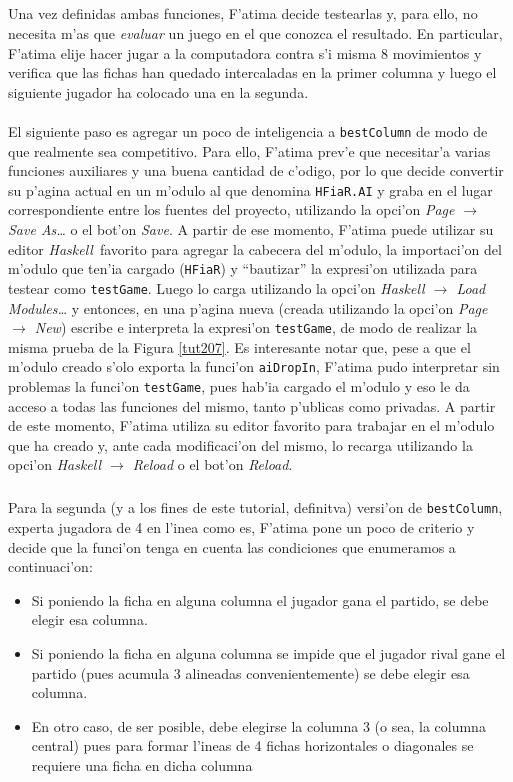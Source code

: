 \documentclass[a4paper]{article}
\newcommand{\haskell}{\textsl{Haskell}}
\begin{document}
\newpage
\subparagraph{}Una vez definidas ambas funciones, F'atima decide testearlas y, para ello, no necesita m'as que \textsl{evaluar} un juego en el que conozca el resultado.  En particular, F'atima elije hacer jugar a la computadora contra s'i misma 8 movimientos y verifica que las fichas han quedado intercaladas en la primer columna y luego el siguiente jugador ha colocado una en la segunda.
\paragraph{}El siguiente paso es agregar un poco de inteligencia a \texttt{bestColumn} de modo de que realmente sea competitivo.  Para ello, F'atima prev'e que necesitar'a varias funciones auxiliares y una buena cantidad de c'odigo, por lo que decide convertir su p'agina actual en un m'odulo al que denomina \texttt{HFiaR.AI} y graba en el lugar correspondiente entre los fuentes del proyecto, utilizando la opci'on \textsl{Page $\rightarrow$ Save As\ldots} o el bot'on \textsl{Save}.  A partir de ese momento, F'atima puede utilizar su editor \haskell\ favorito para agregar la cabecera del m'odulo, la importaci'on del m'odulo que ten'ia cargado (\texttt{HFiaR}) y ``bautizar'' la expresi'on utilizada para testear como \texttt{testGame}.  Luego lo carga utilizando la opci'on \textsl{Haskell $\rightarrow$ Load Modules\ldots} y entonces, en una p'agina nueva (creada utilizando la opci'on \textsl{Page $\rightarrow$ New}) escribe e interpreta la expresi'on \texttt{testGame}, de modo de realizar la misma prueba de la Figura \ref{tut207}.  Es interesante notar que, pese a que el m'odulo creado s'olo exporta la funci'on \texttt{aiDropIn}, F'atima pudo interpretar sin problemas la funci'on \texttt{testGame}, pues hab'ia cargado el m'odulo y eso le da acceso a todas las funciones del mismo, tanto p'ublicas como privadas.  A partir de este momento, F'atima utiliza su editor favorito para trabajar en el m'odulo que ha creado y, ante cada modificaci'on del mismo, lo recarga utilizando la opci'on \textsl{Haskell $\rightarrow$ Reload} o el bot'on \textsl{Reload}.
\subparagraph{}Para la segunda (y a los fines de este tutorial, definitva) versi'on de \texttt{bestColumn}, experta jugadora de 4 en l'inea como es, F'atima pone un poco de criterio y decide que la funci'on tenga en cuenta las condiciones que enumeramos a continuaci'on:
\begin{itemize}
	\item Si poniendo la ficha en alguna columna el jugador gana el partido, se debe elegir esa columna.
	\item Si poniendo la ficha en alguna columna se impide que el jugador rival gane el partido (pues acumula 3 alineadas convenientemente) se debe elegir esa columna.
	\item En otro caso, de ser posible, debe elegirse la columna 3 (o sea, la columna central) pues para formar l'ineas de 4 fichas horizontales o diagonales se requiere una ficha en dicha columna
\end{itemize}
\end{document}
